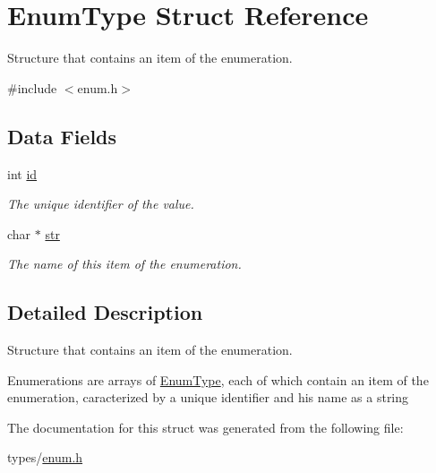 \hypertarget{struct_enum_type}{}\section{Enum\+Type Struct Reference}
\label{struct_enum_type}


Structure that contains an item of the enumeration.  




{\ttfamily \#include $<$enum.\+h$>$}

\subsection*{Data Fields}
\begin{DoxyCompactItemize}
\item 
int \hyperlink{struct_enum_type_a7441ef0865bcb3db9b8064dd7375c1ea}{id}\hypertarget{struct_enum_type_a7441ef0865bcb3db9b8064dd7375c1ea}{}\label{struct_enum_type_a7441ef0865bcb3db9b8064dd7375c1ea}

\begin{DoxyCompactList}\small\item\em The unique identifier of the value. \end{DoxyCompactList}\item 
char $\ast$ \hyperlink{struct_enum_type_ab50d783982593ef993ea0b68f7ad8b80}{str}\hypertarget{struct_enum_type_ab50d783982593ef993ea0b68f7ad8b80}{}\label{struct_enum_type_ab50d783982593ef993ea0b68f7ad8b80}

\begin{DoxyCompactList}\small\item\em The name of this item of the enumeration. \end{DoxyCompactList}\end{DoxyCompactItemize}


\subsection{Detailed Description}
Structure that contains an item of the enumeration. 

Enumerations are arrays of \hyperlink{struct_enum_type}{Enum\+Type}, each of which contain an item of the enumeration, caracterized by a unique identifier and his name as a string 

The documentation for this struct was generated from the following file\+:\begin{DoxyCompactItemize}
\item 
types/\hyperlink{enum_8h}{enum.\+h}\end{DoxyCompactItemize}
